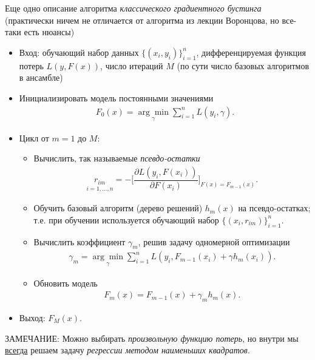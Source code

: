 \documentclass[%
	11pt,
	a4paper,
	utf8,
		]{article}
\begin{document}
Еще одно описание алгоритма \emph{классического градиентного бустинга} (практически ничем не отличается от алгоритма из лекции Воронцова, но все-таки есть нюансы)
\begin{itemize}
	\item Вход: обучающий набор данных $ \{(x_i, y_i)\}_{i=1}^n $, дифференцируемая функция потерь $ L(y, F(x)) $, число итераций $ M $ (по сути число базовых алгоритмов в ансамбле)
	\item Инициализировать модель постоянными значениями
	\begin{align*}
		F_0(x) = \underset{\gamma}{\arg \min} \sum_{i=1}^{n} L(y_i, \gamma).
	\end{align*}

    \item Цикл от $ m = 1 $ до $ M $:
    \begin{itemize}
    	\item Вычислить, так называемые \emph{псевдо-остатки}
    	\begin{align*}
    		\underset{i = 1, \ldots, n}{r_{im}} = - \Big[ \dfrac{\partial L(y_i, F(x_i))}{\partial F(x_i)} \Big]_{ F(x) = F_{m - 1}(x) }.
    	\end{align*}
    
        \item Обучить базовый алгоритм (дерево решений) $ h_m(x) $ на псевдо-остатках; т.е. при обучении используется обучающий набор $ \{ (x_i, r_{im}) \}_{i=1}^n $.
        
        \item Вычислить коэффициент $ \gamma_m $, решив задачу одномерной оптимизации
        \begin{align*}
        	\gamma_m = \underset{\gamma}{\arg \min} \sum_{i = 1}^{n} L(y_i, F_{m - 1}(x_i) + \gamma h_m(x_i)).
        \end{align*}
    
        \item Обновить модель 
        \begin{align*}
        	F_m(x) = F_{m - 1}(x) + \gamma_m h_m(x).
        \end{align*}
    \end{itemize}

    \item Выход: $ F_M(x) $.
\end{itemize}

ЗАМЕЧАНИЕ: Можно выбирать \emph{произвольную функцию потерь}, но внутри мы \underline{всегда} решаем задачу \emph{регрессии методом наименьших квадратов}.
\end{document}
